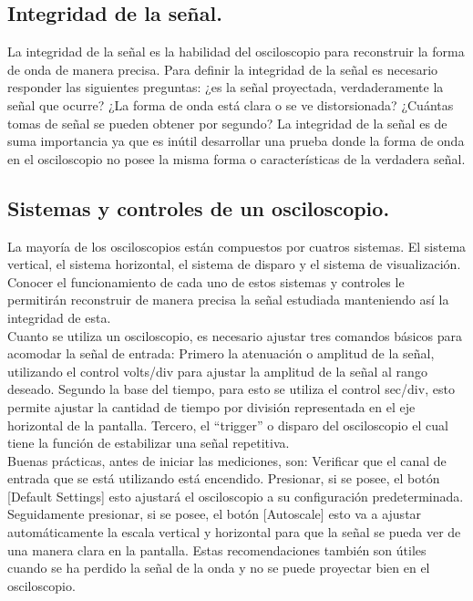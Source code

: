 \documentclass[12pt,letterpaper]{report}
\begin{document}
\subsection{Integridad de la señal.} La integridad de la señal es la habilidad del osciloscopio para reconstruir la forma de onda de manera precisa. Para definir la integridad de la señal es necesario responder las siguientes preguntas: ¿es la señal proyectada, verdaderamente la señal que ocurre? ¿La forma de onda está clara o se ve distorsionada? ¿Cuántas tomas de señal se pueden obtener por segundo? La integridad de la señal es de suma importancia ya que es inútil desarrollar una prueba donde la forma de onda en el osciloscopio no posee la misma forma o características de la verdadera señal.
\subsection{Sistemas y controles de un osciloscopio.} La mayoría de los osciloscopios están compuestos por cuatros sistemas. El sistema vertical, el sistema horizontal, el sistema de disparo y el sistema de visualización. Conocer el funcionamiento de cada uno de estos sistemas y controles le permitirán reconstruir de manera precisa la señal estudiada manteniendo así la integridad de esta.\\
Cuanto se utiliza un osciloscopio, es necesario ajustar tres comandos básicos para acomodar la señal de entrada: Primero la atenuación o amplitud de la señal, utilizando el control volts/div para ajustar la amplitud de la señal al rango deseado. Segundo la base del tiempo, para esto se utiliza el control sec/div, esto permite ajustar la cantidad de tiempo por división representada en el eje horizontal de la pantalla. Tercero, el “trigger” o disparo del osciloscopio el cual tiene la función de estabilizar una señal repetitiva.\\
Buenas prácticas, antes de iniciar las mediciones, son: Verificar que el canal de entrada que se está utilizando está encendido. Presionar, si se posee, el botón [Default Settings] esto ajustará el osciloscopio a su configuración predeterminada. Seguidamente presionar, si se posee, el botón [Autoscale] esto va a ajustar automáticamente la escala vertical y horizontal para que la señal se pueda ver de una manera clara en la pantalla. Estas recomendaciones también son útiles cuando se ha perdido la señal de la onda y no se puede proyectar bien en el osciloscopio.
\end{document}
